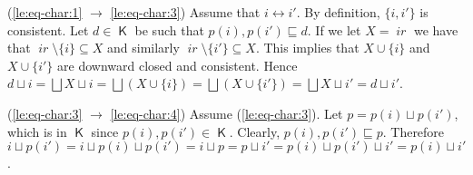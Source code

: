 \documentclass[conference]{IEEEtran}
\renewenvironment{proof}{\begin{IEEEproof}}{\end{IEEEproof}}
\newcommand{\compact}[1]{\ensuremath{\mathop{\mathsf{K}({#1})}}}
\newcommand{\principal}[1]{\ensuremath{\mathop{\downarrow\!{#1}}}}
\newcommand{\ir}[1]{\ensuremath{\mathop{\mathit{ir}({#1})}}}
\newcommand{\pred}[1]{\ensuremath{\mathit{p}({#1})}}
\begin{document}
\begin{proof}



  (\ref{le:eq-char:1} $\to$ \ref{le:eq-char:3})
  Assume that $i \leftrightarrow i'$. By definition, $\{i, i'\}$ is
  consistent. Let $d \in \compact{D}$ be such that
  $\pred{i}, \pred{i'} \sqsubseteq d$. If we let $X = \ir{d}$ we have
  that $\ir{i} \setminus \{i\} \subseteq X$ and similarly
  $\ir{i'} \setminus \{i'\} \subseteq X$.  This implies that
  $X \cup \{ i \}$ and $X \cup \{ i' \}$ are downward closed and
  consistent. Hence
  $d \sqcup i = \bigsqcup X \sqcup i = \bigsqcup (X \cup \{ i \}) =
  \bigsqcup (X \cup \{ i' \}) = \bigsqcup X \sqcup i' = d \sqcup i'$.


  \bigskip

  (\ref{le:eq-char:3} $\to$ \ref{le:eq-char:4})
  Assume (\ref{le:eq-char:3}). Let $p = \pred{i} \sqcup \pred{i'}$,
  which is in $\compact{D}$ since
  $\pred{i}, \pred{i'} \in \compact{D}$. Clearly,
  $\pred{i}, \pred{i'} \sqsubseteq p$.
  Therefore
  $i \sqcup \pred{i'} = i \sqcup \pred{i} \sqcup \pred{i'} = i \sqcup
  p = p \sqcup i' = \pred{i} \sqcup \pred{i'} \sqcup i' = \pred{i}
  \sqcup i'$.


\end{proof}
\end{document}
